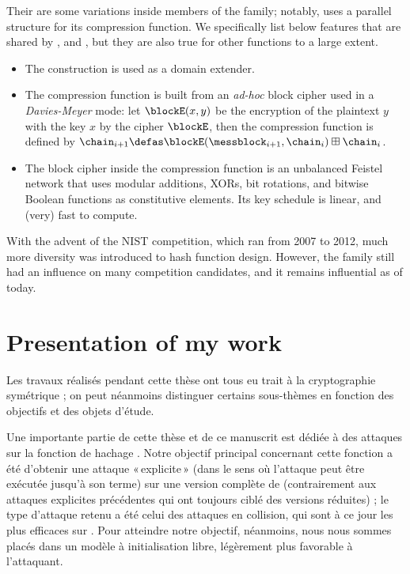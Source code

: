 Their are some variations inside members of the family; notably, \ripemd uses a parallel structure for its compression function. We specifically list below features that are shared by \mdfour, \mdfive and \sha, but they are also
true for other \mdsha functions to a large extent.
\begin{itemize}
\item The \merkdam construction is used as a domain extender.
\item The compression function is built from an \emph{ad-hoc} block cipher used in a \emph{Davies-Meyer} mode: let $\blockE(x,y)$ be the encryption of the plaintext $y$ with the key $x$ by the cipher $\blockE$, then
the compression function is defined by
$\chain_{i+1} \defas \blockE(\messblock_{i+1},\chain_i) \boxplus \chain_i$.
\item The block cipher inside the compression function is an unbalanced Feistel network that uses modular additions, XORs, bit rotations, and bitwise Boolean functions as constitutive elements. Its key schedule is linear, and (very) fast to compute. 
\end{itemize}

With the advent of the NIST \shathree competition, which ran from 2007 to 2012, much more diversity was introduced to hash function design. However, the \mdsha family still had an influence on many competition candidates, and it remains
influential as of today.




\chapter[Présentation de mes travaux]{Presentation of my work}

Les travaux réalisés pendant cette thèse ont tous eu trait à la cryptographie symétrique ; on peut néanmoins distinguer certains sous-thèmes en fonction des objectifs et des objets d'étude.

\medskip

Une importante partie de cette thèse et de ce manuscrit est dédiée à des attaques sur la fonction de hachage \shaone. Notre objectif principal concernant cette fonction a été d'obtenir
une attaque «\,explicite\,» (dans le sens où l'attaque peut être exécutée jusqu'à son terme) sur une version complète de \shaone (contrairement aux attaques explicites précédentes
qui ont toujours ciblé des versions réduites) ; le type d'attaque retenu a été celui des attaques en collision, qui sont à ce jour les plus efficaces sur \shaone.
Pour atteindre notre objectif, néanmoins, nous nous sommes placés dans un modèle à initialisation libre, légèrement plus favorable à l'attaquant.


